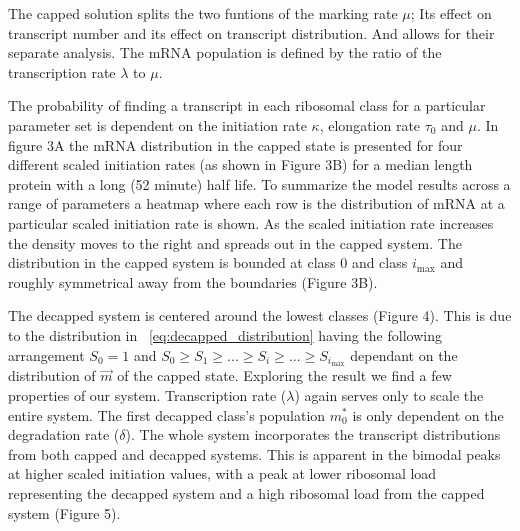 \documentclass[review]{elsarticle}
\newcommand{\imax}{\ensuremath{{i_{\max}}}\xspace}
\begin{document}
The capped solution splits the two funtions of the marking rate $\mu$; Its effect on transcript number and its effect on transcript distribution. And allows for their separate analysis. The mRNA population is defined by the ratio of the transcription rate $\lambda$ to $\mu$.  

The probability of finding a transcript in each ribosomal class for a particular parameter set is dependent on the initiation rate $\kappa$, elongation rate $\tau_0$ and $\mu$. In figure 3A the mRNA distribution in the capped state is presented for four different scaled initiation rates (as shown in Figure 3B) for a median length protein with a long (52 minute) half life. To summarize the model results across a range of parameters a heatmap where each row is the distribution of mRNA at a particular scaled initiation rate is shown. As the scaled initiation rate increases the density moves to the right and spreads out in the capped system.  The distribution in the capped system is bounded at class 0 and class \imax and roughly symmetrical away from the boundaries (Figure 3B). 

The decapped system is centered around the lowest classes (Figure 4). This is due to the distribution in ~\ref{eq:decapped_distribution} having the following arrangement $S_{0}=1$ and $ S_{0} \ge S_{1} \ge ... \ge S_{i} \ge ... \ge S_{\imax}$ dependant on the distribution of $\vec{m}$ of the capped state. Exploring the result we find a few properties of our system. Transcription rate ($\lambda$) again serves only to scale the entire system. The first decapped class's population $m_{0}^{*}$ is only dependent on the degradation rate ($\delta$). The whole system incorporates the transcript distributions from both capped and decapped systems. This is apparent in the bimodal peaks at higher scaled initiation values, with a peak at lower ribosomal load representing the decapped system and a high ribosomal load from the capped system (Figure 5).
\end{document}
